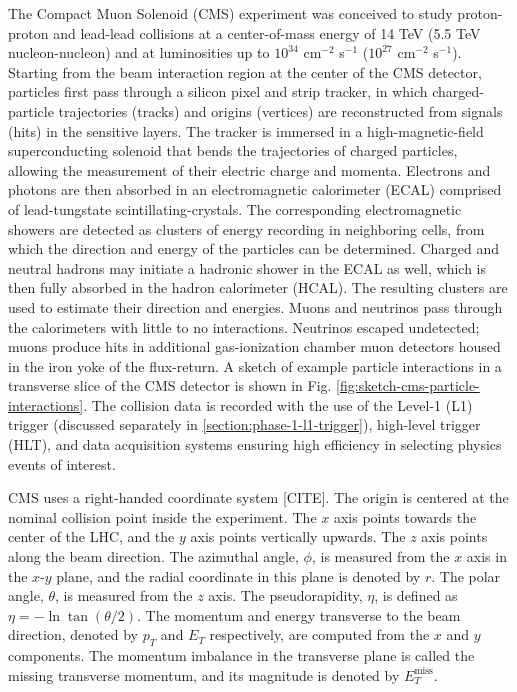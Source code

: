 \documentclass{article}
\begin{document}
The Compact Muon Solenoid (CMS) experiment was conceived to study proton-proton and lead-lead collisions at a center-of-mass energy of 14 TeV (5.5 TeV nucleon-nucleon) and at luminosities up to $10^{34}$ cm$^{-2}$ s$^{-1}$ ($10^{27}$ cm$^{-2}$ s$^{-1}$). Starting from the beam interaction region at the center of the CMS detector, particles first pass through a silicon pixel and strip tracker, in which charged-particle trajectories (tracks) and origins (vertices) are reconstructed from signals (hits) in the sensitive layers. The tracker is immersed in a high-magnetic-field superconducting solenoid that bends the trajectories of charged particles, allowing the measurement of their electric charge and momenta. Electrons and photons are then absorbed in an electromagnetic calorimeter (ECAL) comprised of lead-tungstate scintillating-crystals. The corresponding electromagnetic showers are detected as clusters of energy recording in neighboring cells, from which the direction and energy of the particles can be determined. Charged and neutral hadrons may initiate a hadronic shower in the ECAL as well, which is then fully absorbed in the hadron calorimeter (HCAL). The resulting clusters are used to estimate their direction and energies. Muons and neutrinos pass through the calorimeters with little to no interactions. Neutrinos escaped undetected; muons produce hits in additional gas-ionization chamber muon detectors housed in the iron yoke of the flux-return. A sketch of example particle interactions in a transverse slice of the CMS detector is shown in Fig. \ref{fig:sketch-cms-particle-interactions}. The collision data is recorded with the use of the Level-1 (L1) trigger (discussed separately in \ref{section:phase-1-l1-trigger}), high-level trigger (HLT), and data acquisition systems ensuring high efficiency in selecting physics events of interest. 


CMS uses a right-handed coordinate system [CITE]. The origin is centered at the nominal collision point inside the experiment. The $x$ axis points towards the center of the LHC, and the $y$ axis points vertically upwards. The $z$ axis points along the beam direction. The azimuthal angle, $\phi$, is measured from the $x$ axis in the $x$-$y$ plane, and the radial coordinate in this plane is denoted by $r$. The polar angle, $\theta$, is measured from the $z$ axis. The pseudorapidity, $\eta$, is defined as $\eta = -\ln \tan(\theta/2)$. The momentum and energy transverse to the beam direction, denoted by $p_{T}$ and $E_{T}$ respectively, are computed from the $x$ and $y$ components. The momentum imbalance in the transverse plane is called the missing transverse momentum, and its magnitude is denoted by $E_{T}^{\text{miss}}$.
\end{document}
